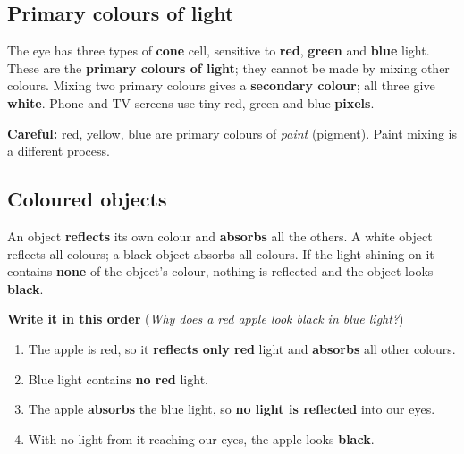 \documentclass[11pt]{article}
\begin{document}
\subsection*{Primary colours of light}
\begin{minipage}[t]{0.5\textwidth}
\vspace{0pt}
The eye has three types of \textbf{cone} cell, sensitive to \textbf{red}, \textbf{green} and \textbf{blue} light. These are the \textbf{primary colours of light}; they cannot be made by mixing other colours.
Mixing two primary colours gives a \textbf{secondary colour}; all three give \textbf{white}. Phone and TV screens use tiny red, green and blue \textbf{pixels}.

\textbf{Careful:} red, yellow, blue are primary colours of \emph{paint} (pigment). Paint mixing is a different process.
\end{minipage}\hfill
\begin{minipage}[t]{0.47\textwidth}
\vspace{0pt}\centering
\FigRGB[5mm]
\end{minipage}

\subsection*{Coloured objects}
An object \textbf{reflects} its own colour and \textbf{absorbs} all the others. A white object reflects all colours; a black object absorbs all colours.
If the light shining on it contains \textbf{none} of the object's colour, nothing is reflected and the object looks \textbf{black}.
\begin{center}\FigObject[5mm]\end{center}

\textbf{Write it in this order} (\emph{Why does a red apple look black in blue light?})
\begin{enumerate}
\item The apple is red, so it \textbf{reflects only red} light and \textbf{absorbs} all other colours.
\item Blue light contains \textbf{no red} light.
\item The apple \textbf{absorbs} the blue light, so \textbf{no light is reflected} into our eyes.
\item With no light from it reaching our eyes, the apple looks \textbf{black}.
\end{enumerate}
\end{document}
